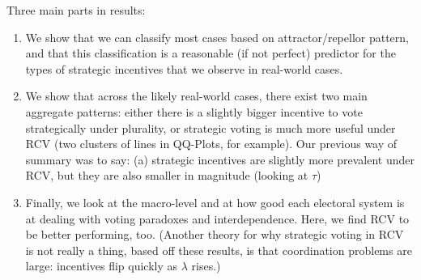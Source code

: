 \documentclass[11pt, letter]{article}
\begin{document}
Three main parts in results:

\begin{enumerate}
\item We show that we can classify most cases based on attractor/repellor pattern, and that this classification is a reasonable (if not perfect) predictor for the types of strategic incentives that we observe in real-world cases.
\item We show that across the likely real-world cases, there exist two main aggregate patterns: either there is a slightly bigger incentive to vote strategically under plurality, or strategic voting is much more useful under RCV (two clusters of lines in QQ-Plots, for example). Our previous way of summary was to say: (a) strategic incentives are slightly more prevalent under RCV, but they are also smaller in magnitude (looking at $\tau$)
\item Finally, we look at the macro-level and at how good each electoral system is at dealing with voting paradoxes and interdependence. Here, we find RCV to be better performing, too. (Another theory for why strategic voting in RCV is not really a thing, based off these results, is that coordination problems are large: incentives flip quickly as $\lambda$ rises.)
\end{enumerate}
\end{document}
